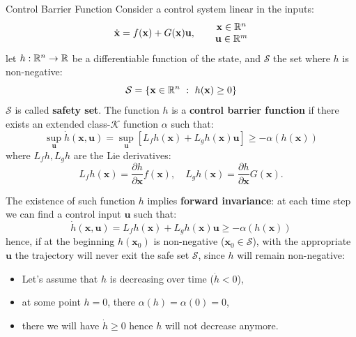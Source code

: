 \documentclass[10pt, a4paper]{report}
\begin{document}
\begin{boxdefinition}{Control Barrier Function}{}
    Consider a control system linear in the inputs:\begin{equation}
        \dot{\mathbf x}=f(\mathbf x)+G(\mathbf x)\mathbf u,\qquad\begin{matrix}
            \mathbf x\in{\mathbb R}^n\\ 
            \mathbf u\in {\mathbb R}^m
        \end{matrix}
    \end{equation}
    let $h:{\mathbb R}^n\to {\mathbb R}$ be a differentiable function of the state, and $\mathcal S$ the set where $h$ is non-negative:\begin{equation}
        \mathcal S=\{\mathbf x\in {\mathbb R}^n \ : \ h(\mathbf x)\ge 0\}
    \end{equation}
    $\mathcal S$ is called \textbf{safety set}. The function $h$ is a \textbf{control barrier function} if there exists an extended class-$\mathcal K$ function $\alpha$ such that:\begin{equation}
        \sup_{\mathbf u}\dot h(\mathbf x,\mathbf u)=\sup_{\mathbf u}\left[
            L_fh(\mathbf x)+L_gh(\mathbf x)\mathbf u
        \right]\ge -\alpha(h(\mathbf x))
    \end{equation}
    where $L_fh,L_gh$ are the Lie derivatives:\begin{equation}
        L_f h(\mathbf x) = \frac{\partial h}{\partial\mathbf  x} f(\mathbf x),\quad
        L_g h(\mathbf x) = \frac{\partial h}{\partial\mathbf  x} G(\mathbf x).
    \end{equation}
\end{boxdefinition}
The existence of such function $h$ implies \textbf{forward invariance}: at each time step we can find a control input $\mathbf u$ such that:\begin{equation}
    \dot h(\mathbf x,\mathbf u)=L_f h(\mathbf x) + L_g h(\mathbf x)\mathbf u \ge -\alpha(h(\mathbf x))
\end{equation}
hence, if at the beginning $h(\mathbf x_0)$ is non-negative ($\mathbf x_0\in\mathcal S$), with the appropriate $\mathbf u$ the trajectory will never exit the safe set $\mathcal S$, since $h$ will remain non-negative:\begin{itemize}
    \item Let's assume that $h$ is decreasing over time ($\dot h < 0$),
    \item at some point $h=0$, there $\alpha(h)=\alpha(0)=0$,
    \item there we will have $\dot h \ge 0 $ hence $h$ will not decrease anymore.
\end{itemize}
\end{document}
